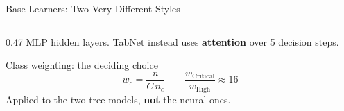 \begin{frame}{Base Learners: Two Very Different Styles}
\begin{columns}[T]
\begin{column}{0.47\textwidth}
      \vspace{1mm}
      {\scriptsize MLP hidden layers. TabNet instead uses \textbf{attention}
      over 5 decision steps.}

      \vspace{1mm}
      \begin{alertblock}{Class weighting: the deciding choice}
        \small\vspace{-2mm}
        \[ w_c = \frac{n}{C\, n_c} \qquad
           \frac{w_{\text{Critical}}}{w_{\text{High}}} \approx 16 \]
        \small Applied to the two tree models, \textbf{not} the neural ones.
      \end{alertblock}
    \end{column}
  \end{columns}
\end{frame}
